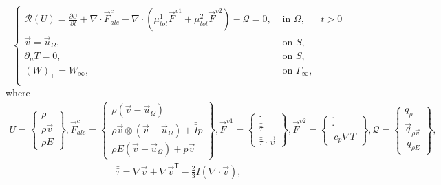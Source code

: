 \begin{equation} 
\label{rans}
\left\{\begin{array} {lll}
\mathcal{R}(U) = \frac{\partial U}{\partial t} + \nabla \cdot \vec{F}^{c}_{ale} -  \nabla \cdot ( \mu_{tot}^{1}\vec{F}^{v1} + \mu_{tot}^{2}\vec{F}^{v2}) - \mathcal{Q} = 0, & \mbox{  in } \Omega, & t > 0  \\
\vec{v} = \vec{u}_\Omega, &  \mbox{ on }  S,  \\
\partial_n T = 0, &  \mbox{ on }  S,   \\
(W)_+ = W_\infty,  & \mbox{ on }  \Gamma_\infty, \\
\end{array}\right.
\end{equation}
where
\begin{align} 
\label{euler_f}
U = \left \{ \begin{array}{c} \rho \\ \rho \vec{v} \\ \rho E \end{array} \right \},
\vec{F}^{c}_{ale} = \left \{ \begin{array}{c} \rho (\vec{v} - \vec{u}_\Omega)  \\ \rho \vec{v} \otimes  (\vec{v} - \vec{u}_\Omega) + \bar{\bar{I}} p \\ \rho E (\vec{v} - \vec{u}_\Omega) + p \vec{v}   \end{array} \right \},
\vec{F}^{v1} = \left \{ \begin{array}{c} \cdot \\ \bar{\bar{\tau}} \\ \bar{\bar{\tau}} \cdot \vec{v}  \end{array} \right  \},
\vec{F}^{v2} = \left \{ \begin{array}{c} \cdot \\ \cdot \\ \ c_p \nabla T   \end{array} \right \}, 
\mathcal{Q} = \left \{ \begin{array}{c} q_{\rho} \\ \vec{q}_{\rho \vec{v}} \\ \ q_{\rho E}   \end{array} \right \},
\end{align}
\begin{align} 
\label{tau}
\bar{\bar{\tau}} = \nabla \vec{v} + {\nabla \vec{v}}^\mathsf{T}  - \frac{2}{3} \bar{\bar{I}} (\nabla \cdot \vec{v} ),
\end{align}

